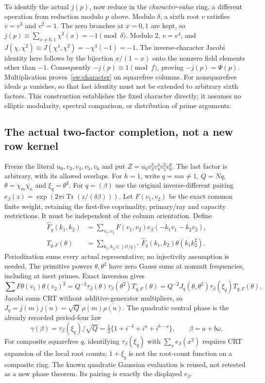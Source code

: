 To identify the actual $j(p)$, now reduce in the \emph{character-value}
ring, a different operation from reduction modulo $p$ above.
Modulo $\delta$, a sixth root $v$ satisfies $v=v^3$ and $v^2=1$.
The zero branches at $x=0,1$ are kept, so
$j(p)\equiv\sum_{x\ne0,1}\chi^3(x)=-1\pmod\delta$.
Modulo $2$, $v=v^4$, and
$J(\chi,\chi^2)\equiv J(\chi^4,\chi^2)=-\chi^4(-1)=-1$.
The inverse-character Jacobi identity here follows by the bijection
$x/(1-x)$ onto the nonzero field elements other than $-1$.
Consequently $-j(p)\equiv1\pmod f$, proving $-j(p)=\Psi(p)$.
Multiplication proves~\eqref{sw:character} on squarefree columns.
For nonsquarefree ideals $\mu$ vanishes, so that last identity must not
be extended to arbitrary sixth factors. This construction establishes the
fixed character directly; it assumes no elliptic modularity, spectral
comparison, or distribution of prime arguments.

\subsection{The actual two-factor completion, not a new row kernel}
Freeze the literal $u_0,v_3,v_4,v_5,v_6$ and put
$Z=u_0v_3^3v_4^4v_5^5v_6^6$. The last factor is arbitrary, with its allowed
overlaps. For $h=1$, write $q=mn\ne1$, $Q=Nq$,
$\theta=\chi_m\overline{\chi_n}$ and $\xi_q=\theta^3$.
For $q=(\beta)$ use the original inverse-different pairing
$e_\beta(z)=\exp(2\pi i\operatorname{Tr}(z/(\delta\beta)))$.
Let $F(v_1,v_2)$ be the exact common finite weight, retaining the first-five
coprimality, primary/ray and capacity restrictions. It must be independent
of the column orientation. Define
\begin{align*}
 \widehat F_q(k_1,k_2)&=\sum_{v_1,v_2}F(v_1,v_2)
                       e_\beta(-k_1v_1-k_2v_2),\\
 T_{q,F}(\theta)&=\sum_{k_1,k_2\in(\mathcal O/q)^\times}
           \widehat F_q(k_1,k_2)\overline{\theta(k_1k_2^2)}.
\end{align*}
Periodization sums every actual representative; no injectivity assumption
is needed. The primitive powers $\theta,\theta^2$ have zero Gauss sums
at nonunit frequencies, including at inert primes. Exact inversion gives
\[
 \sum F\theta(v_1)\theta(v_2)^2
  =Q^{-2}\tau_\beta(\theta)\tau_\beta(\theta^2)T_{q,F}(\theta)
  =Q^{-2}J_q(\theta,\theta^2)\tau_\beta(\xi_q)T_{q,F}(\theta).
\]
Jacobi sums CRT without additive-generator multipliers, so
$J_q=j(m)\overline{j(n)}=\sqrt Q\,\rho(m)\overline{\rho(n)}$.
The quadratic central phase is the already recorded period-four law
\[
 \gamma(\beta)=\tau_\beta(\xi_q)/\sqrt Q
     =\tfrac12\{1+i^{-b}+i^a+i^{b-a}\},\qquad \beta=a+b\omega.
\]
For composite squarefree $q$, identifying $\tau_\beta(\xi_q)$ with
$\sum_xe_\beta(x^2)$ requires CRT expansion of the local root counts;
$1+\xi_q$ is not the root-count function on a composite ring.
The known quadratic Gaussian evaluation is reused, not retested as a new
phase theorem. Its pairing is exactly the displayed $e_\beta$.

